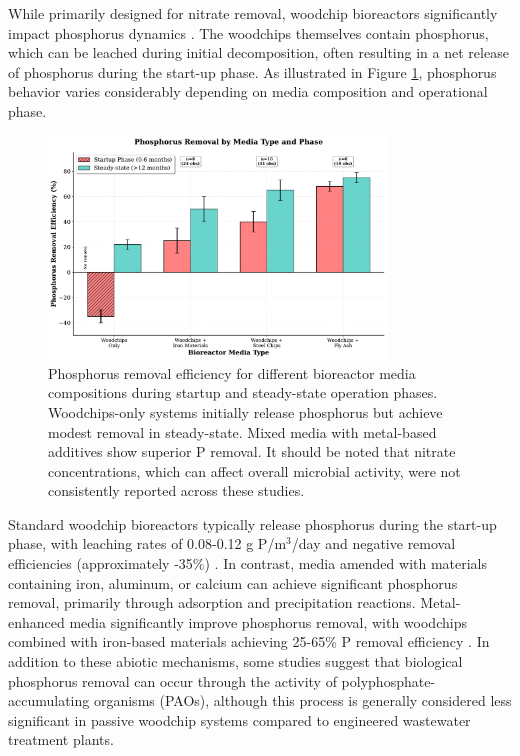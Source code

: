 \documentclass[12pt,a4paper]{article}
\begin{document}
While primarily designed for nitrate removal, woodchip bioreactors significantly impact phosphorus dynamics \citep{RN625}. The woodchips themselves contain phosphorus, which can be leached during initial decomposition, often resulting in a net release of phosphorus during the start-up phase. As illustrated in Figure \ref{fig:phosphorus_removal}, phosphorus behavior varies considerably depending on media composition and operational phase.

\begin{figure}[ht]
\centering
\includegraphics[width=0.8\textwidth]{fig7_phosphorus_scientific}
\caption{Phosphorus removal efficiency for different bioreactor media compositions during startup and steady-state operation phases. Woodchips-only systems initially release phosphorus but achieve modest removal in steady-state. Mixed media with metal-based additives show superior P removal. It should be noted that nitrate concentrations, which can affect overall microbial activity, were not consistently reported across these studies.}
\label{fig:phosphorus_removal}
\end{figure}

Standard woodchip bioreactors typically release phosphorus during the start-up phase, with leaching rates of 0.08-0.12 g P/m$^3$/day and negative removal efficiencies (approximately -35\%) \citep{RN625}. In contrast, media amended with materials containing iron, aluminum, or calcium can achieve significant phosphorus removal, primarily through adsorption and precipitation reactions. Metal-enhanced media significantly improve phosphorus removal, with woodchips combined with iron-based materials achieving 25-65\% P removal efficiency \citep{RN625}. In addition to these abiotic mechanisms, some studies suggest that biological phosphorus removal can occur through the activity of polyphosphate-accumulating organisms (PAOs), although this process is generally considered less significant in passive woodchip systems compared to engineered wastewater treatment plants.
\end{document}

